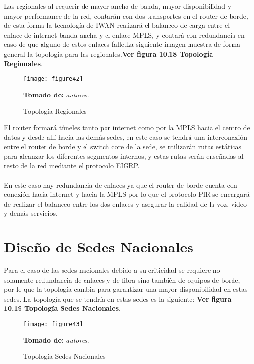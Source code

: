 Las regionales al requerir de mayor ancho de banda, mayor disponibilidad y mayor performance de la red, contarán con dos transportes en el router de borde, de esta forma la tecnología de IWAN realizará el balanceo de carga entre el enlace de internet banda ancha y el enlace MPLS, y contará con redundancia en caso de que alguno de estos enlaces falle.La siguiente imagen muestra de forma general la topología para las regionales.\textbf{Ver figura 10.18 Topología Regionales}.

\begin{figure}[htbp]
  \centering
    {\texttt{[image: figure42]}}%
  \caption{\footnotesize{Topología Regionales}}
  \footnotesize{\textbf{Tomado de:} \textit{autores}.}
  \label{fig:fig2subfig}
\end{figure}

El router formará túneles tanto por internet como por la MPLS hacia el centro de datos y desde allí hacia las demás sedes, en este caso se tendrá una interconexión entre el router de borde y el switch core de la sede, se utilizarán rutas estáticas para alcanzar los diferentes segmentos internos, y estas rutas serán enseñadas al resto de la red mediante el protocolo EIGRP.
\\
\\
En este caso hay redundancia de enlaces ya que el router de borde cuenta con conexión hacia internet y hacia la MPLS por lo que el protocolo PfR se encargará de realizar el balanceo entre los dos enlaces y asegurar la calidad de la voz, video y demás servicios.

\section{Diseño de Sedes Nacionales} %
\label{sec:Diseño de Sedes Nacionales}

Para el caso de las sedes nacionales debido a su criticidad se requiere no solamente redundancia de enlaces y de fibra sino también de equipos de borde, por lo que la topología cambia para garantizar una mayor disponibilidad en estas sedes. La topología que se tendría en estas sedes es la siguiente: \textbf{Ver figura 10.19 Topología Sedes Nacionales}.

\begin{figure}[htbp]
  \centering
    {\texttt{[image: figure43]}}%
  \caption{\footnotesize{Topología Sedes Nacionales}}
  \footnotesize{\textbf{Tomado de:} \textit{autores}.}
  \label{fig:fig2subfig}
\end{figure}


